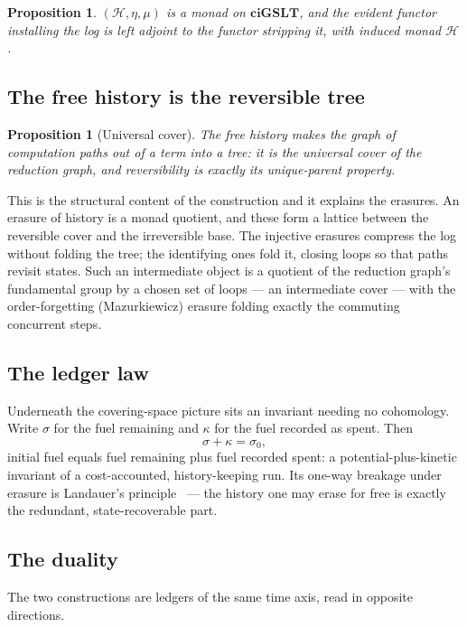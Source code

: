 \documentclass[11pt]{article}
\theoremstyle{definition}
\theoremstyle{plain}
\newtheorem{proposition}[definition]{Proposition}
\theoremstyle{remark}
\newcommand{\ciGSLT}{\mathbf{ciGSLT}}
\newcommand{\hist}{\mathcal{H}}
\begin{document}
\begin{proposition}
$(\hist, \eta, \mu)$ is a monad on $\ciGSLT$, and the evident functor installing the log
is left adjoint to the functor stripping it, with induced monad $\hist$.
\end{proposition}

\subsection{The free history is the reversible tree}

\begin{proposition}[Universal cover]
The free history makes the graph of computation paths out of a term into a \emph{tree}:
it is the universal cover of the reduction graph, and reversibility is exactly its
unique-parent property.
\end{proposition}

This is the structural content of the construction and it explains the erasures. An
erasure of history is a monad quotient, and these form a lattice between the reversible
cover and the irreversible base. The injective erasures compress the log without folding
the tree; the identifying ones fold it, closing loops so that paths revisit states. Such
an intermediate object is a quotient of the reduction graph's fundamental group by a
chosen set of loops --- an intermediate cover --- with the order-forgetting
(Mazurkiewicz) erasure folding exactly the commuting concurrent steps.

\subsection{The ledger law}

Underneath the covering-space picture sits an invariant needing no cohomology. Write
$\sigma$ for the fuel remaining and $\kappa$ for the fuel recorded as spent. Then
\[
  \sigma + \kappa = \sigma_0 ,
\]
initial fuel equals fuel remaining plus fuel recorded spent: a potential-plus-kinetic
invariant of a cost-accounted, history-keeping run. Its one-way breakage under erasure is
Landauer's principle~\cite{Landauer1961} --- the history one may erase for free is exactly
the redundant, state-recoverable part.

\subsection{The duality}

The two constructions are ledgers of the same time axis, read in opposite directions.
\end{document}

